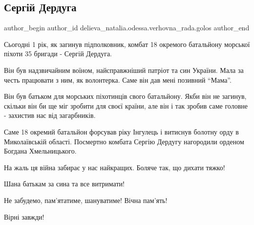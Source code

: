  
 
 
 
 

\subsection{Сергій Дердуга}
\label{sec:03_06_2023.fb.delieva_natalia.odessa.verhovna_rada.golos.1.sergij_derduga}

\ifcmt
 author_begin
   author_id delieva_natalia.odessa.verhovna_rada.golos
 author_end
\fi

Сьогодні 1 рік, як загинув підполковник, комбат 18 окремого батальйону морської
піхоти 35 бригади - Сергій Дердуга. 

Він був надзвичайним воїном, найсправжніший патріот та син України. Мала за
честь працювати з ним, як волонтерка. Саме він дав мені позивний \enquote{Мама}. 

Він був батьком для морських піхотинців свого батальйону. Якби він не загинув,
скільки він би ще міг зробити для своєї країни, але він і так зробив саме
головне - захистив нас від загарбників. 

Саме 18 окремий батальйон форсував ріку Інгулець і витиснув болотну орду в
Миколаївській області. Посмертно комбата Сергію Дердугу нагородили орденом
Богдана Хмельницького. 

На жаль ця війна забирає у нас найкращих. Боляче так, що дихати тяжко! 

Шана батькам за сина та все витримати! 

Не забудемо, пам'ятатиме, шануватиме! Вічна пам'ять! 

Вірні завжди!
